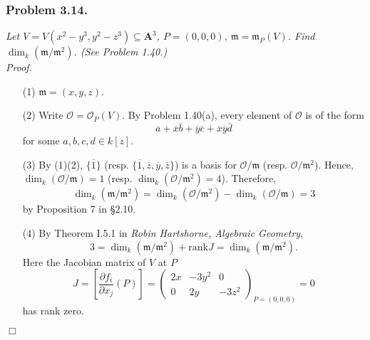 \documentclass{article}
\begin{document}



\subsubsection*{Problem 3.14.}
\emph{Let $V = V(x^2-y^3, y^2-z^3) \subseteq \mathbf{A}^3$,
$P = (0, 0, 0)$, $\mathfrak{m} = \mathfrak{m}_P(V)$.
Find $\dim_k(\mathfrak{m}/\mathfrak{m}^2)$. (See Problem 1.40.)} \\



\emph{Proof.}
\begin{enumerate}
\item[(1)]
  $\mathfrak{m} = (x, y, z)$.

\item[(2)]
  Write $\mathscr{O} = \mathscr{O}_P(V)$.
  By Problem 1.40(a),
  every element of $\mathscr{O}$ is of the form
  \[
    \overline{a}
    + \overline{x}\overline{b}
    + \overline{y}\overline{c}
    + \overline{x}\overline{y}\overline{d}
  \]
  for some $a, b, c, d \in k[z]$.

\item[(3)]
  By (1)(2),
  $\{ \overline{1} \}$ (resp. $\{ \overline{1}, \overline{z}, \overline{y}, \overline{z} \}$)
  is a basis for $\mathscr{O}/\mathfrak{m}$ (resp. $\mathscr{O}/\mathfrak{m}^2$).
  Hence, $\dim_k(\mathscr{O}/\mathfrak{m}) = 1$ (resp. $\dim_k(\mathscr{O}/\mathfrak{m}^2) = 4$).
  Therefore,
  \[
    \dim_k(\mathfrak{m}/\mathfrak{m}^2)
    = \dim_k(\mathscr{O}/\mathfrak{m}^2) - \dim_k(\mathscr{O}/\mathfrak{m})
    = 3
  \]
  by Proposition 7 in \S 2.10.

\item[(4)]
  By Theorem I.5.1 in \emph{Robin Hartshorne, Algebraic Geometry},
  \[
    3
    = \dim_k(\mathfrak{m}/\mathfrak{m}^2) + \mathrm{rank} J
    = \dim_k(\mathfrak{m}/\mathfrak{m}^2).
  \]
  Here the Jacobian matrix of $V$ at $P$
  \[
    J
    = \left[ \frac{\partial f_i}{\partial x_j}(P) \right]
    =
    \begin{pmatrix}
      2x & -3y^2 & 0 \\
      0 & 2y & -3z^2
    \end{pmatrix}_{P=(0,0,0)}
    = 0
  \]
  has rank zero.
\end{enumerate}
$\Box$ \\\\
\end{document}
